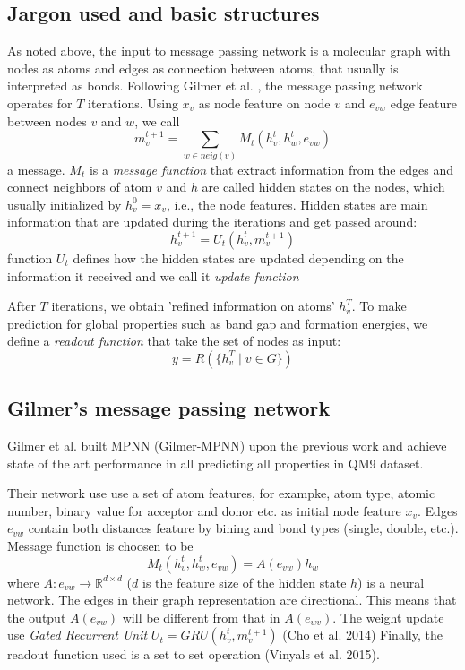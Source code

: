 \documentclass{article}
\begin{document}
\subsection{Jargon used and basic structures}
As noted above, the input to message passing network is a molecular graph with nodes as atoms and edges as 
connection between atoms, that usually is interpreted as bonds. 
Following Gilmer et al. \cite{Gilmer}, 
the message passing network operates for $T$ iterations. 
Using $x_v$ as node feature on node $v$ and $e_{vw}$ edge feature between nodes $v$ and $w$, we call
\begin{equation}
    m_{v}^{t+1} = \sum_{w\in neig(v)} M_t(h^t_v, h^t_w, e_{vw})
\end{equation}
a message. $M_t$ is a \emph{message function} that extract information from the edges and connect neighbors of atom $v$ and 
$h$ are called hidden states on the nodes, which usually initialized by $h^0_v = x_v$, i.e., the node features. 
Hidden states are main information that are updated during the iterations and get passed around:
\begin{equation}
    h^{t+1}_v = U_t(h_v^t, m_{v}^{t+1})
\end{equation}
function $U_t$ defines how the hidden states are updated depending on the information it received and we call it 
\emph{update function}

After $T$ iterations, we obtain 'refined information on atoms' $h_v^T$. To make prediction for global properties 
such as band gap and formation energies, we define a \emph{readout function} that take the set of nodes as input:
\begin{equation}
    y = R(\{h_v^T\mid v\in G\})
\end{equation}

\subsection{Gilmer's message passing network}
Gilmer et al. built MPNN (Gilmer-MPNN) upon the previous work and achieve state of the art performance in all predicting all properties 
in QM9 dataset. 

Their network use use a set of atom features, for exampke, atom type, atomic number, binary value for acceptor and donor etc. as  
initial node feature $x_v$. Edges $e_{vw}$ contain both distances feature by bining and bond types (single, double, etc.). 
Message function is choosen to be 
\begin{equation}
    M_t(h^t_v, h^t_w, e_{vw}) = A(e_{vw}) h_w
\end{equation}
where $A\colon e_{vw} \to \mathbb{R}^{d\times d}$ ($d$ is the feature size of the hidden state $h$) is a neural network. 
The edges in their graph representation are directional. This means that the output $A(e_{vw})$ will be different from that 
in $A(e_{wv})$. 
The weight update use \emph{Gated Recurrent Unit} $U_t = GRU(h_v^t, m_v^{t+1})$ (Cho et al. 2014)
Finally, the readout function used is a set to set operation (Vinyals et al. 2015).
\end{document}
